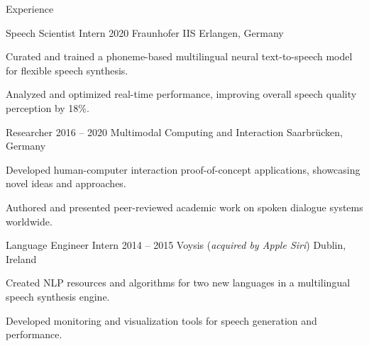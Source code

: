 \documentclass{resume} %
\begin{document}
\begin{rSection}{Experience}
\begin{rSubsection}
	{Speech Scientist Intern}
	{2020}
	{Fraunhofer IIS}
	{Erlangen, Germany}
	
	\setlength{\itemindent}{.5cm}
	
	\item Curated and trained a phoneme-based multilingual neural text-to-speech model for flexible speech synthesis.
	\item Analyzed and optimized real-time performance, improving overall speech quality perception by 18\%.
\end{rSubsection}

\begin{rSubsection}
	{Researcher}
	{2016 -- 2020}
	{Multimodal Computing and Interaction}
	{Saarbrücken, Germany}
	
	\setlength{\itemindent}{.5cm}
	
	\item Developed human-computer interaction proof-of-concept applications, showcasing novel ideas and approaches.
	\item Authored and presented peer-reviewed academic work on spoken dialogue systems worldwide.
\end{rSubsection}

%	
%	

\begin{rSubsection}
	{Language Engineer Intern}
	{2014 -- 2015}
	{Voysis (\textit{acquired by Apple Siri})}
	{Dublin, Ireland}
	
	\setlength{\itemindent}{.5cm}

	\item Created NLP resources and algorithms for two new languages in a multilingual speech synthesis engine.
	\item Developed monitoring and visualization tools for speech generation and performance.
\end{rSubsection}


\end{rSection}
\end{document}
